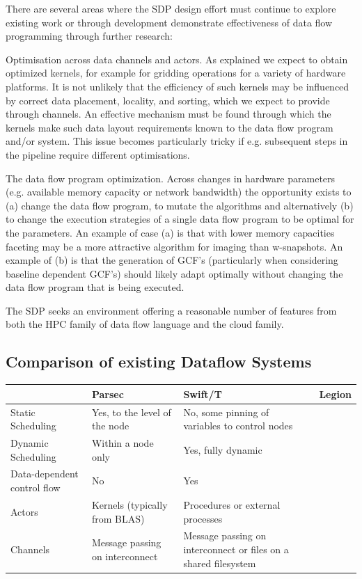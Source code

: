 \documentclass[11pt,a4paper]{article}
\begin{document}
There are several areas where the SDP design effort must continue to
explore existing work or through development demonstrate effectiveness
of data flow programming through further research:

Optimisation across data channels and actors.  As explained we expect
to obtain optimized kernels, for example for gridding operations for a
variety of hardware platforms.  It is not unlikely that the efficiency
of such kernels may be influenced by correct data placement, locality,
and sorting, which we expect to provide through channels.  An
effective mechanism must be found through which the kernels make such
data layout requirements known to the data flow program and/or
system. This issue becomes particularly tricky if e.g. subsequent
steps in the pipeline require different optimisations.

The data flow program optimization.  Across changes in hardware
parameters (e.g. available memory capacity or network bandwidth) the
opportunity exists to (a) change the data flow program, to mutate the
algorithms and alternatively (b) to change the execution strategies of
a single data flow program to be optimal for the parameters.  An
example of case (a) is that with lower memory capacities faceting may
be a more attractive algorithm for imaging than w-snapshots.  An
example of (b) is that the generation of GCF’s (particularly when
considering baseline dependent GCF’s) should likely adapt optimally
without changing the data flow program that is being executed.

The SDP seeks an environment offering a reasonable number of features
from both the HPC family of data flow language and the cloud family.

\subsection{Comparison of  existing Dataflow Systems}

\begin{table}[h]
\centering
\begin{tabular}{|p{}|p{}|p{}|p{}|}
 \hline
& Parsec & Swift/T & Legion\\\hline
Static Scheduling &
Yes, to the level of the node &
No, some pinning of variables to control nodes 
&\\\hline
Dynamic Scheduling &
Within a node only&
Yes, fully dynamic&\\\hline
Data-dependent control flow &
No & Yes & \\\hline
Actors & Kernels (typically from BLAS) & Procedures or external processes & \\\hline
Channels &
Message passing on interconnect &
Message passing on interconnect or files on a shared filesystem & \\\hline
\end{tabular}
\end{table}
\end{document}
